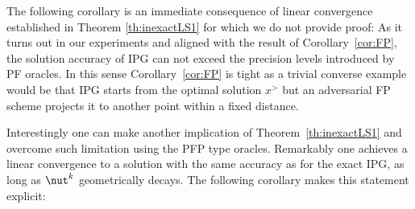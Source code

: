 {}

The following corollary is an immediate consequence of linear convergence established in Theorem \ref{th:inexactLS1} for which we do not provide proof:
{}
As it turns out in our experiments and aligned with the result of Corollary~\ref{cor:FP}, the solution accuracy of IPG can not exceed the precision levels introduced by PF oracles. In this sense Corollary~\ref{cor:FP} is tight as a trivial converse example would be that IPG starts from the optimal solution $x^\gt$ but an adversarial FP scheme projects it to another point within a fixed distance. 

Interestingly one can make another implication of Theorem~\ref{th:inexactLS1} and overcome such limitation using the PFP type oracles.
Remarkably 
one achieves a linear convergence to a solution with the same accuracy as for the exact IPG, 
as long as $\nut^k$ geometrically decays. 	
The following corollary makes this statement explicit:
	
	
